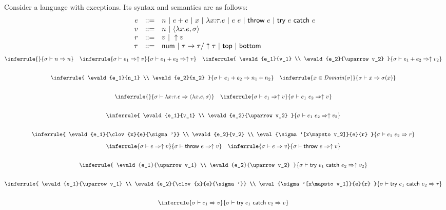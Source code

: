 \begin{exercise}

Consider a language with exceptions. Its syntax and semantics are as
  follows:
\[
  \begin{array}{rrl}
    e & ::= & n\ |\ \eadd{e}{e}\ |\ x\ |\ \efunt{x}{\tau}{e}\ |\
    \eapp{e}{e}\ |\ \textsf{throw}\ e\ |\ \textsf{try}\ e\ \textsf{catch}\ e \\
    v & ::= & n\ |\ \clov{x}{e}{\sigma} \\
    r & ::= & v\ |\ \uparrow v \\
    \tau & ::= & \tnum\ |\ \tarrow{\tau}{\tau/\uparrow\tau} \ |\ \ttop\ |\ \tbot
  \end{array}
\]
\[
\begin{array}{@{}c}
  \inferrule
  {}
  { \evald{n}{n} }
  \quad
  \inferrule
  { \evald{e_1}{\uparrow v} }
  { \evald{\eadd{e_1}{e_2}}{\uparrow v} }
  \quad
  \inferrule
  { \evald{e_1}{v_1} \\
    \evald{e_2}{\uparrow v_2} }
  { \evald{\eadd{e_1}{e_2}}{\uparrow v_2} }
  \\[2em]
  \inferrule
  { \evald{e_1}{n_1} \\
    \evald{e_2}{n_2} }
  { \evald{\eadd{e_1}{e_2}}{n_1+n_2} }
  \quad
  \inferrule
  { x\in\dom{\sigma} }
  { \evald{x}{\sigma(x)} }
  \\[2em]
  \inferrule
  {}
  { \evald{\efunt{x}{\tau}{e}}{\clov{x}{e}{\sigma}} }
  \quad
  \inferrule
  { \evald{e_1}{\uparrow v} }
  { \evald{\eapp{e_1}{e_2}}{\uparrow v} }
  \\[2em]
  \inferrule
  { \evald{e_1}{v_1} \\
    \evald{e_2}{\uparrow v_2} }
  { \evald{\eapp{e_1}{e_2}}{\uparrow v_2} }
  \\[2em]
  \inferrule
  { \evald{e_1}{\clov{x}{e}{\sigma'}} \\
    \evald{e_2}{v_2} \\
    \eval{\sigma'[x\mapsto v_2]}{e}{r} }
  { \evald{\eapp{e_1}{e_2}}{r} }
\end{array}
\]
\[
\begin{array}{@{}c}
  \inferrule
  { \evald{e}{\uparrow v} }
  { \evald{\textsf{throw}\ e}{\uparrow v} }
  \quad
  \inferrule
  { \evald{e}{v} }
  { \evald{\textsf{throw}\ e}{\uparrow v} }
  \\[2em]
  \inferrule
  { \evald{e_1}{\uparrow v_1} \\ \evald{e_2}{\uparrow v_2} }
  { \evald{\textsf{try}\ e_1\ \textsf{catch}\ e_2}{\uparrow v_2} }
  \\[2em]
  \inferrule
  { \evald{e_1}{\uparrow v_1} \\
    \evald{e_2}{\clov{x}{e}{\sigma'}} \\
    \eval{\sigma'[x\mapsto v_1]}{e}{r} }
  { \evald{\textsf{try}\ e_1\ \textsf{catch}\ e_2}{r} }
  \\[2em]
  \inferrule
  { \evald{e_1}{v} }
  { \evald{\textsf{try}\ e_1\ \textsf{catch}\ e_2}{v} }
\end{array}
\]


\end{exercise}
